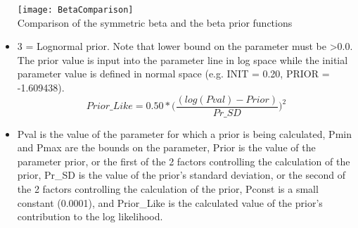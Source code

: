 \begin{itemize}
	\begin{center}
		\texttt{[image: BetaComparison]}\\
		Comparison of the symmetric beta and the beta prior functions
	\end{center}

	\item 3 = Lognormal prior.  Note that lower bound on the parameter must be >0.0. The prior value is input into the parameter line in log space while the initial parameter value is defined in normal space (e.g. INIT = 0.20, PRIOR = -1.609438).
	\begin{equation}
		Prior\_Like = 0.50*\Big(\frac{(log(Pval)-Prior)}{Pr\_SD}\Big)^2
	\end{equation}
	\item Pval is the value of the parameter for which a prior is being calculated, Pmin and Pmax are the bounds on the parameter, Prior is the value of the parameter prior, or the first of the 2 factors controlling the calculation of the prior, Pr\_SD is the value of the prior's standard deviation, or the second of the 2 factors controlling the calculation of the prior, Pconst is a small constant (0.0001), and Prior\_Like is the calculated value of the prior's contribution to the log likelihood.
\end{itemize}
